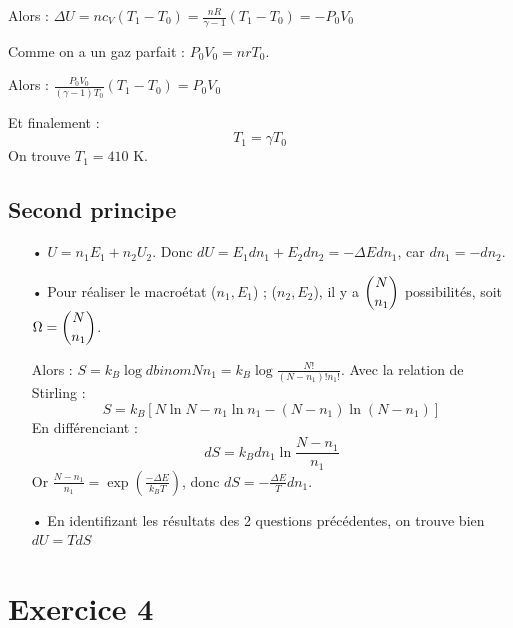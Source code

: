 \documentclass{report}
\begin{document}
Alors : 
$\Delta U = nc_V(T_1-T_0)=\frac{nR}{\gamma-1}(T_1-T_0) = -P_0V_0$

Comme on a un gaz parfait : $P_0V_0=nrT_0$. 

Alors : $\frac{P_0V_0}{(\gamma-1)T_0}(T_1-T_0)=P_0V_0$

Et finalement :
\begin{equation}
T_1=\gamma T_0
\end{equation}
On trouve $T_1=410$ K.


\subsection*{Second principe}

\begin{itemize}
\item[•] $U=n_1E_1+n_2U_2$. Donc $dU=E_1dn_1+E_2dn_2=-\Delta E dn_1$, car $dn_1=-dn_2$.
\item[•] Pour réaliser le macroétat {($n_1, E_1$) ; ($n_2, E_2$)}, il y a $\dbinom{N}{n_1}$ possibilités, soit $\Omega=\dbinom{N}{n_1}$.

Alors : $S=k_B\log dbinom{N}{n_1} =k_B\log\frac{N!}{(N-n_1)!n_1!}$. Avec la relation de Stirling : 
\begin{equation}
S = k_B[N\ln N-n_1\ln n_1 - (N-n_1)\ln (N-n_1)]
\end{equation}
En différenciant :
\begin{equation}
dS=k_Bdn_1\ln\frac{N-n_1}{n_1}
\end{equation}
Or $\frac{N-n_1}{n_1}=\exp(\frac{-\Delta E}{k_BT})$, donc $dS=-\frac{\Delta E}{T}dn_1$.

\item[•] En identifizant les résultats des 2 questions précédentes, on trouve bien $dU=TdS$
\end{itemize}

\section*{Exercice 4}
\end{document}
